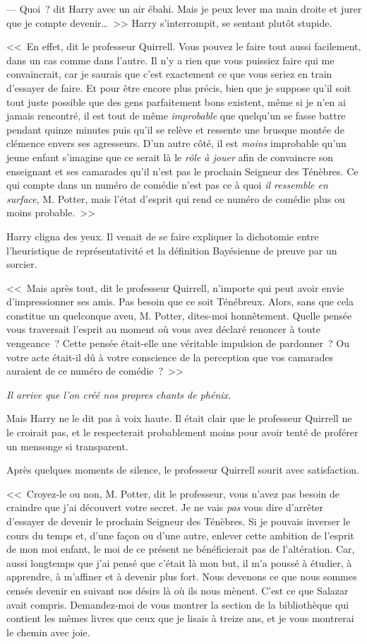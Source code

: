 --- Quoi~? dit Harry avec un air ébahi. Mais je peux lever ma main droite et jurer que je compte devenir…~>> Harry s'interrompit, se sentant plutôt stupide.

<<~En effet, dit le professeur Quirrell. Vous pouvez le faire tout aussi facilement, dans un cas comme dans l'autre. Il n'y a rien que vous puissiez faire qui me convaincrait, car je saurais que c'est exactement ce que vous seriez en train d'essayer de faire. Et pour être encore plus précis, bien que je suppose qu'il soit tout juste possible que des gens parfaitement bons existent, même si je n'en ai jamais rencontré, il est tout de même \emph{improbable} que quelqu'un se fasse battre pendant quinze minutes puis qu'il se relève et ressente une brusque montée de clémence envers ses agresseurs. D'un autre côté, il est \emph{moins} improbable qu'un jeune enfant s'imagine que ce serait là le \emph{rôle à jouer} afin de convaincre son enseignant et ses camarades qu'il n'est pas le prochain Seigneur des Ténèbres. Ce qui compte dans un numéro de comédie n'est pas ce à quoi \emph{il ressemble en surface}, M. Potter, mais l'état d'esprit qui rend ce numéro de comédie plus ou moins probable.~>>

Harry cligna des yeux. Il venait de se faire expliquer la dichotomie entre l'heuristique de représentativité et la définition Bayésienne de preuve par un sorcier.

<<~Mais après tout, dit le professeur Quirrell, n'importe qui peut avoir envie d'impressionner ses amis. Pas besoin que ce soit Ténébreux. Alors, sans que cela constitue un quelconque aveu, M. Potter, dites-moi honnêtement. Quelle pensée vous traversait l'esprit au moment où vous avez déclaré renoncer à toute vengeance~? Cette pensée était-elle une véritable impulsion de pardonner~? Ou votre acte était-il dû à votre conscience de la perception que vos camarades auraient de ce numéro de comédie~?~>>

\emph{Il arrive que l'on créé nos propres chants de phénix.}

Mais Harry ne le dit pas à voix haute. Il était clair que le professeur Quirrell ne le croirait pas, et le respecterait probablement moins pour avoir tenté de proférer un mensonge si transparent.

Après quelques moments de silence, le professeur Quirrell sourit avec satisfaction.

<<~Croyez-le ou non, M. Potter, dit le professeur, vous n'avez pas besoin de craindre que j'ai découvert votre secret. Je ne vais \emph{pas} vous dire d'arrêter d'essayer de devenir le prochain Seigneur des Ténèbres. Si je pouvais inverser le cours du temps et, d'une façon ou d'une autre, enlever cette ambition de l'esprit de mon moi enfant, le moi de ce présent ne bénéficierait pas de l'altération. Car, aussi longtemps que j'ai pensé que c'était là mon but, il m'a poussé à étudier, à apprendre, à m'affiner et à devenir plus fort. Nous devenons ce que nous sommes censés devenir en suivant nos désirs là où ils nous mènent. C'est ce que Salazar avait compris. Demandez-moi de vous montrer la section de la bibliothèque qui contient les mêmes livres que ceux que je lisais à treize ans, et je vous montrerai le chemin avec joie.

